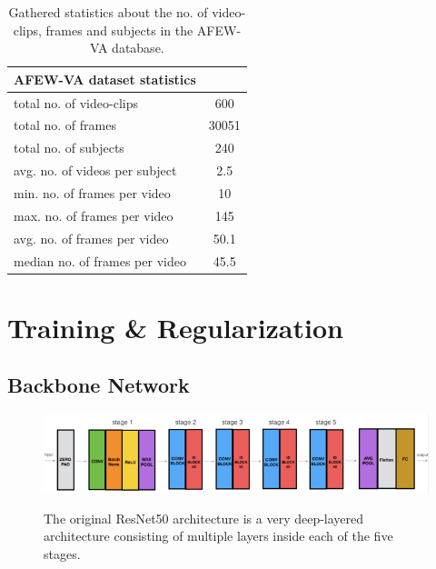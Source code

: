 \begin{table}[H]
\begin{center}
\begin{tabular}{@{}lc@{}}
\toprule
\textbf{AFEW-VA dataset statistics} &  \\ \midrule
total no. of video-clips & 600 \\
total no. of frames & 30051 \\
total no. of subjects & 240 \\
avg. no. of videos per subject & 2.5 \\
min. no. of frames per video & 10 \\
max. no. of frames per video & 145 \\
avg. no. of frames per video & 50.1 \\
median no. of frames per video & 45.5 \\ \bottomrule
\end{tabular}
\caption[AFEW-VA dataset statistics]{Gathered statistics about the no. of video-clips, frames and subjects in the AFEW-VA database.}
\label{tab:DatasetStatistics}
\end{center}
\end{table}

\section{Training \& Regularization}
\subsection{Backbone Network}

\begin{figure}[H]
  \begin{center}
  \includegraphics[angle=0, width=1.0\textwidth]{Figures/resnet50.png}
  \citep{Dwivedi:2019:ResNetInKeras}
  \caption[ResNet50 architecture overview]{The original ResNet50 \citep{He:2015:DeepResidualLearningForImageRecognition} architecture is a very deep-layered architecture consisting of multiple layers inside each of the five stages.}
  \label{fig:ResNet50Architecture}
  \end{center}
\end{figure}

